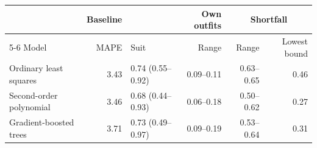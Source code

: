 \begin{tabular}{lrlrrr}
\toprule
 & Baseline & & Own outfits & \multicolumn{2}{c}{Shortfall} \\
\cmidrule(lr){5-6}
Model & MAPE & Suit & Range & Range & Lowest bound \\
\midrule
Ordinary least squares & 3.43 & 0.74 (0.55--0.92) & 0.09--0.11 & 0.63--0.65 & 0.46 \\
Second-order polynomial & 3.46 & 0.68 (0.44--0.93) & 0.06--0.18 & 0.50--0.62 & 0.27 \\
Gradient-boosted trees & 3.71 & 0.73 (0.49--0.97) & 0.09--0.19 & 0.53--0.64 & 0.31 \\
\bottomrule
\end{tabular}
